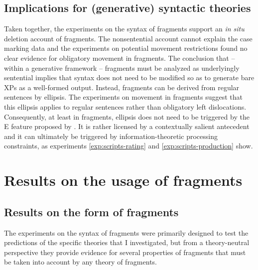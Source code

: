 \subsection{Implications for (generative) syntactic theories}
Taken together, the experiments on the syntax of fragments support an \textit{in situ} deletion account of fragments. The nonsentential account cannot explain the case marking data and the experiments on potential movement restrictions found no clear evidence for obligatory movement in fragments. The conclusion that -- within a generative framework -- fragments must be analyzed as underlyingly sentential implies that syntax does not need to be modified so as to generate bare XPs as a well-formed output. Instead, fragments can be derived from regular sentences by ellipsis. The experiments on movement in fragments suggest that this ellipsis applies to regular sentences rather than obligatory left dislocations. Consequently, at least in fragments, ellipsis does not need to be triggered by the E feature proposed by \citet{merchant2004}. It is rather licensed by a contextually salient antecedent and it can ultimately be triggered by information-theoretic processing constraints, as experiments \ref{exp:scripts-rating} and \ref{exp:scripts-production} show.

\section{Results on the usage of fragments}
\subsection{Results on the form of fragments}

The experiments on the syntax of fragments were primarily designed to test the predictions of the specific theories that I investigated, but from a theory-neutral perspective they provide evidence for several properties of fragments that must be taken into account by any theory of fragments. 
\largerpage

